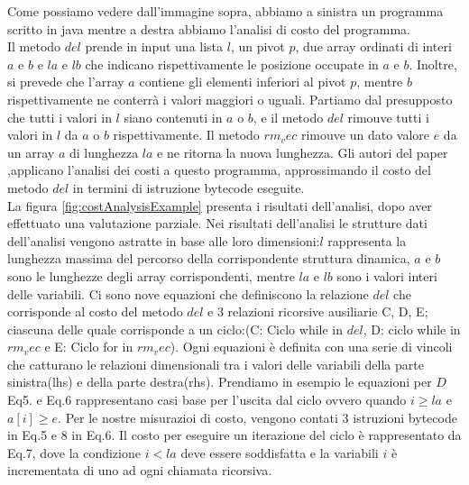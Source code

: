 \documentclass[../../main.tex]{subfiles}
\begin{document}
Come possiamo vedere dall'immagine sopra, abbiamo a sinistra un programma scritto in java mentre a destra abbiamo l'analisi di costo del programma.\\
Il metodo $del$ prende in input una lista $l$, un pivot $p$, due array ordinati di interi $a$ e $b$ e $la$ e $lb$ che indicano rispettivamente le posizione occupate in $a$ e $b$.
Inoltre, si prevede che l'array $a$ contiene gli elementi inferiori al pivot $p$, mentre $b$ rispettivamente ne conterrà i valori maggiori o uguali.
Partiamo dal presupposto che tutti i valori in $l$ siano contenuti in $a$ o $b$, e il metodo $del$ rimouve tutti i valori in $l$ da $a$ o $b$ rispettivamente.
Il metodo $rm_vec$ rimouve un dato valore $e$ da un array $a$ di lunghezza $la$ e ne ritorna la nuova lunghezza.
Gli autori del paper \autocite{albert2008automatic},applicano l'analisi dei costi a questo programma, approssimando il costo del metodo $del$ in termini di istruzione bytecode eseguite.\\
La figura \ref{fig:costAnalysisExample} presenta i risultati dell'analisi, dopo aver effettuato una valutazione parziale.
Nei risultati dell'analisi le strutture dati dell'analisi vengono astratte in base alle loro dimensioni:$l$ rappresenta la lunghezza massima del percorso della corrispondente struttura dinamica, $a$ e $b$ sono le lunghezze degli array corrispondenti, mentre $la$ e $lb$ sono i valori interi delle variabili.
Ci sono nove equazioni che definiscono la relazione $ del $ che corrisponde al costo del metodo $del$ e 3 relazioni ricorsive ausiliarie C, D, E; ciascuna delle quale corrisponde a un ciclo:(C: Ciclo while in $del$, D: ciclo while in $rm_vec$ e E: Ciclo for in $rm_vec$).
Ogni equazioni è definita con una serie di vincoli che catturano le relazioni dimensionali tra i valori delle variabili della parte sinistra(lhs) e della parte destra(rhs).
Prendiamo in esempio le equazioni per $D$ Eq5. e Eq.6 rappresentano casi base per l'uscita dal ciclo ovvero quando $i \geq la$ e $a[i]\geq e$.
Per le nostre misurazioi di costo, vengono contati 3 istruzioni bytecode in Eq.5 e 8 in Eq.6.
Il costo per eseguire un iterazione del ciclo è rappresentato da Eq.7, dove la condizione $i < la$ deve essere soddisfatta e la variabili $i$ è incrementata di uno ad ogni chiamata ricorsiva.
\end{document}
